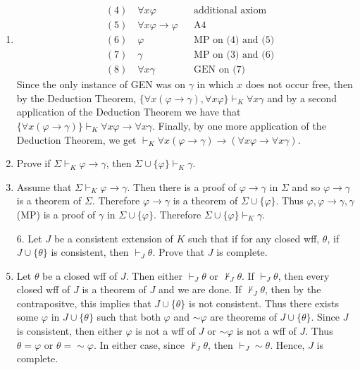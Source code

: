 \documentclass[12pt]{article}
\makeatletter
\theoremstyle{definition}
\theoremstyle{remark}
\renewenvironment{proof}[1][\proofname]{\par
  \pushQED{\qed}%
  \normalfont \topsep6\p@\@plus6\p@\relax
  \list{}{\leftmargin=0mm
          \rightmargin=4mm
          \settowidth{\itemindent}{\itshape#1}%
          \labelwidth=\itemindent
          \parsep=0pt \listparindent=\parindent 
  }
  \item[\hskip\labelsep
        \itshape
    #1\@addpunct{.}]\ignorespaces
}{%
  \popQED\endlist\@endpefalse
}
\let\oldproofname=\proofname
\renewcommand{\proofname}{\bf{\textit{\oldproofname}}}
\makeatother
\begin{document}
\begin{enumerate}[leftmargin=*]
\begin{proof}
\begin{align*}
                    &(4) \quad\forall x\varphi && \text{additional axiom} \\
                    &(5) \quad\forall x\varphi\rightarrow\varphi && \text{A4} \\
                    &(6) \quad\varphi && \text{MP on (4) and (5)} \\
                    &(7) \quad\gamma && \text{MP on (3) and (6)} \\
                    &(8) \quad\forall x\gamma && \text{GEN on (7)}
                \end{align*}
            Since the only instance of GEN was on $\gamma$ in which $x$ does not occur free, then by the Deduction Theorem, $\{\forall x(\varphi\rightarrow\gamma),\forall x\varphi\}\vdash_K\forall x\gamma$ and by a second application of the Deduction Theorem we have that $\{\forall x(\varphi\rightarrow\gamma)\}\vdash_K\forall x\varphi\rightarrow\forall x\gamma$. Finally, by one more application of the Deduction Theorem, we get $\vdash_K\forall x(\varphi\rightarrow\gamma)\rightarrow(\forall x\varphi\rightarrow\forall x\gamma)$.
            \end{proof}
        \item Prove if $\Sigma\vdash_K\varphi\rightarrow\gamma$, then $\Sigma\cup\{\varphi\}\vdash_K\gamma$.
            \begin{proof}
                Assume that $\Sigma\vdash_K\varphi\rightarrow\gamma$. Then there is a proof of $\varphi\rightarrow\gamma$ in $\Sigma$ and so $\varphi\rightarrow\gamma$ is a theorem of $\Sigma$. Therefore $\varphi\rightarrow\gamma$ is a theorem of $\Sigma\cup\{\varphi\}$. Thus $\varphi,\varphi\rightarrow\gamma,\gamma$ (MP) is a proof of $\gamma$ in $\Sigma\cup\{\varphi\}$. Therefore $\Sigma\cup\{\varphi\}\vdash_K\gamma$.
            \end{proof}\newpage
        \item[6.] Let $J$ be a consistent extension of $K$ such that if for any closed wff, $\theta$, if $J\cup\{\theta\}$ is consistent, then $\vdash_J\theta$. Prove that $J$ is complete.
            \begin{proof}
                Let $\theta$ be a closed wff of $J$. Then either $\vdash_J\theta$ or $\not\vdash_J\theta$. If $\vdash_J\theta$, then every closed wff of $J$ is a theorem of $J$ and we are done. If $\not\vdash_J\theta$, then by the contrapositve, this implies that $J\cup\{\theta\}$ is not consistent. Thus there exists some $\varphi$ in $J\cup\{\theta\}$ such that both $\varphi$ and $\sim\varphi$ are theorems of $J\cup\{\theta\}$. Since $J$ is consistent, then either $\varphi$ is not a wff of $J$ or $\sim\varphi$ is not a wff of $J$. Thus $\theta=\varphi$ or $\theta=\sim\varphi$. In either case, since $\not\vdash_J\theta$, then $\vdash_J\sim\theta$. Hence, $J$ is complete.

\end{proof}
\end{enumerate}
\end{document}
